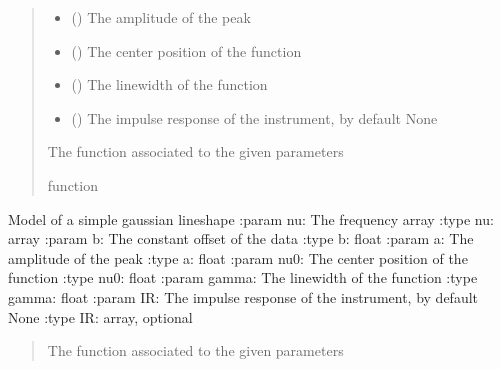 \documentclass[letterpaper,10pt,english]{sphinxmanual}
\begin{document}
\begin{fulllineitems}
\begin{fulllineitems}
\begin{quote}
\begin{description}
\begin{itemize}
\item {} 
\sphinxAtStartPar
{} () \textendash{} The amplitude of the peak

\item {} 
\sphinxAtStartPar
{} () \textendash{} The center position of the function

\item {} 
\sphinxAtStartPar
{} () \textendash{} The linewidth of the function

\item {} 
\sphinxAtStartPar
{} (\sphinxstyleliteralemphasis{\sphinxupquote{, }}) \textendash{} The impulse response of the instrument, by default None

\end{itemize}

\sphinxAtStartPar
The function associated to the given parameters

\sphinxAtStartPar
function

\end{description}\end{quote}

\end{fulllineitems}


\begin{fulllineitems}
\label{\detokenize{source/_autosummary/HDF5_BLS_treat.Models:HDF5_BLS_treat.Models.gaussian}}
\pysigstartsignatures
\pysiglinewithargsret
{}
{\sphinxparamcomma {}\sphinxparamcomma {}\sphinxparamcomma {}\sphinxparamcomma {}\sphinxparamcomma {}}
{}
\pysigstopsignatures
\sphinxAtStartPar
Model of a simple gaussian lineshape
:param nu: The frequency array
:type nu: array
:param b: The constant offset of the data
:type b: float
:param a: The amplitude of the peak
:type a: float
:param nu0: The center position of the function
:type nu0: float
:param gamma: The linewidth of the function
:type gamma: float
:param IR: The impulse response of the instrument, by default None
:type IR: array, optional
\begin{quote}\begin{description}
\sphinxAtStartPar
The function associated to the given parameters


\end{description}
\end{quote}
\end{fulllineitems}
\end{fulllineitems}
\end{document}

